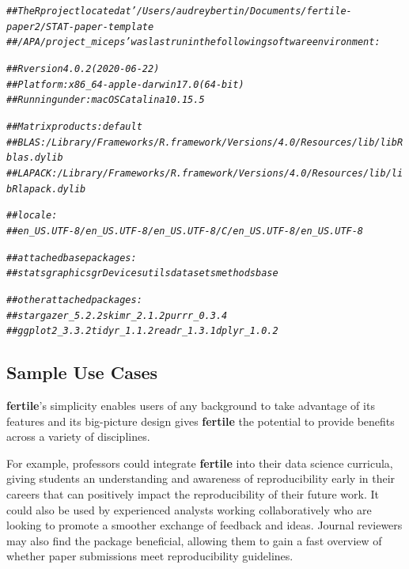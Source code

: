 \documentclass[APA,LATO1COL]{WileyNJD-v2}\usepackage[]{graphicx}\usepackage[]{color}
\makeatletter
\newcommand{\hlcom}[1]{\textcolor[rgb]{0.678,0.584,0.686}{\textit{#1}}}%
\newenvironment{kframe}{%
 \def\at@end@of@kframe{}%
 \ifinner\ifhmode%
  \def\at@end@of@kframe{\end{minipage}}%
  \begin{minipage}{\columnwidth}%
 \fi\fi%
 \def\FrameCommand##1{\hskip\@totalleftmargin \hskip-\fboxsep
 \colorbox{shadecolor}{##1}\hskip-\fboxsep
     \hskip-\linewidth \hskip-\@totalleftmargin \hskip\columnwidth}%
 \MakeFramed {\advance\hsize-\width
   \@totalleftmargin\z@ \linewidth\hsize
   \@setminipage}}%
 {\par\unskip\endMakeFramed%
 \at@end@of@kframe}
\newenvironment{knitrout}{}{} %
\newcommand{\pkg}[1]{\textbf{#1}}
\makeatother
\begin{document}
\begin{knitrout}
\color{fgcolor}\begin{kframe}
\begin{alltt}
\hlcom{##  The R project located at '/Users/audreybertin/Documents/fertile-paper2/STAT-paper-template}
\hlcom{##  /APA/project_miceps' was last run in the following software environment:}

\hlcom{##  R version 4.0.2 (2020-06-22)}
\hlcom{##  Platform: x86_64-apple-darwin17.0 (64-bit)}
\hlcom{##  Running under: macOS Catalina 10.15.5}

\hlcom{##  Matrix products: default}
\hlcom{##  BLAS:   /Library/Frameworks/R.framework/Versions/4.0/Resources/lib/libRblas.dylib}
\hlcom{##  LAPACK: /Library/Frameworks/R.framework/Versions/4.0/Resources/lib/libRlapack.dylib}

\hlcom{##  locale:}
\hlcom{##  en_US.UTF-8/en_US.UTF-8/en_US.UTF-8/C/en_US.UTF-8/en_US.UTF-8}

\hlcom{##  attached base packages:}
\hlcom{##  stats     graphics  grDevices utils     datasets  methods   base     }

\hlcom{##  other attached packages:}
\hlcom{##  stargazer_5.2.2    skimr_2.1.2        purrr_0.3.4       }
\hlcom{##  ggplot2_3.3.2      tidyr_1.1.2        readr_1.3.1        dplyr_1.0.2}
\end{alltt}
\end{kframe}
\end{knitrout}



\subsection{Sample Use Cases}

\pkg{fertile}'s simplicity enables users of any background to take advantage of its features and its big-picture design gives \pkg{fertile} the potential to provide benefits across a variety of disciplines. 

For example, professors could integrate \pkg{fertile} into their data science curricula, giving students an understanding and awareness of reproducibility early in their careers that can positively impact the reproducibility of their future work. It could also be used by experienced analysts working collaboratively who are looking to promote a smoother exchange of feedback and ideas. Journal reviewers may also find the package beneficial, allowing them to gain a fast overview of whether paper submissions meet reproducibility guidelines.
\end{document}
